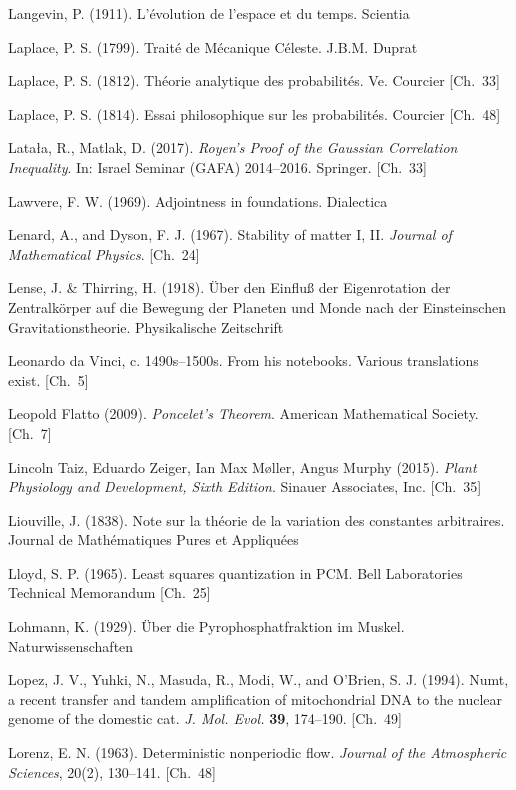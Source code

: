 \begin{list}{}{%
  \setlength{\leftmargin}{2em}%
  \setlength{\itemindent}{-2em}%
  \setlength{\itemsep}{0.35\baselineskip}%
  \setlength{\parsep}{0pt}%
  \setlength{\topsep}{0.5em}}
\item Langevin, P. (1911). L'évolution de l'espace et du temps. Scientia
\item Laplace, P. S. (1799). Traité de Mécanique Céleste. J.B.M. Duprat
\item Laplace, P. S. (1812). Théorie analytique des probabilités. Ve. Courcier \hfill {\scriptsize [Ch.~33]}
\item Laplace, P. S. (1814). Essai philosophique sur les probabilités. Courcier \hfill {\scriptsize [Ch.~48]}
\item Latała, R., Matlak, D. (2017). \textit{Royen's Proof of the Gaussian Correlation Inequality}. In: Israel Seminar (GAFA) 2014–2016. Springer. \hfill {\scriptsize [Ch.~33]}
\item Lawvere, F. W. (1969). Adjointness in foundations. Dialectica
\item Lenard, A., and Dyson, F. J. (1967). Stability of matter I, II. \textit{Journal of Mathematical Physics}. \hfill {\scriptsize [Ch.~24]}
\item Lense, J. \& Thirring, H. (1918). Über den Einfluß der Eigenrotation der Zentralkörper auf die Bewegung der Planeten und Monde nach der Einsteinschen Gravitationstheorie. Physikalische Zeitschrift
\item Leonardo da Vinci, c. 1490s–1500s. From his notebooks. Various translations exist. \hfill {\scriptsize [Ch.~5]}
\item Leopold Flatto (2009). \textit{Poncelet's Theorem}. American Mathematical Society. \hfill {\scriptsize [Ch.~7]}
\item Lincoln Taiz, Eduardo Zeiger, Ian Max Møller, Angus Murphy (2015). \textit{Plant Physiology and Development, Sixth Edition}. Sinauer Associates, Inc. \hfill {\scriptsize [Ch.~35]}
\item Liouville, J. (1838). Note sur la théorie de la variation des constantes arbitraires. Journal de Mathématiques Pures et Appliquées
\item Lloyd, S. P. (1965). Least squares quantization in PCM. Bell Laboratories Technical Memorandum \hfill {\scriptsize [Ch.~25]}
\item Lohmann, K. (1929). Über die Pyrophosphatfraktion im Muskel. Naturwissenschaften
\item Lopez, J. V., Yuhki, N., Masuda, R., Modi, W., and O'Brien, S. J. (1994). Numt, a recent transfer and tandem amplification of mitochondrial DNA to the nuclear genome of the domestic cat. \textit{J. Mol. Evol.} \textbf{39}, 174–190. \hfill {\scriptsize [Ch.~49]}
\item Lorenz, E. N. (1963). Deterministic nonperiodic flow. \textit{Journal of the Atmospheric Sciences}, 20(2), 130–141. \hfill {\scriptsize [Ch.~48]}

\end{list}
